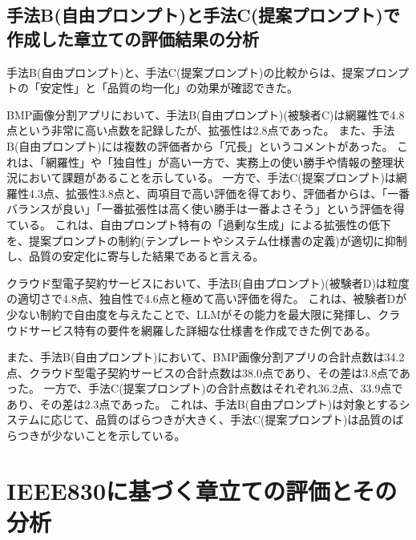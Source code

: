 
\subsection{手法B(自由プロンプト)と手法C(提案プロンプト)で作成した章立ての評価結果の分析}
手法B(自由プロンプト)と、手法C(提案プロンプト)の比較からは、提案プロンプトの「安定性」と「品質の均一化」の効果が確認できた。

BMP画像分割アプリにおいて、手法B(自由プロンプト)(被験者C)は網羅性で4.8点という非常に高い点数を記録したが、拡張性は2.8点であった。
また、手法B(自由プロンプト)には複数の評価者から「冗長」というコメントがあった。
これは、「網羅性」や「独自性」が高い一方で、実務上の使い勝手や情報の整理状況において課題があることを示している。
一方で、手法C(提案プロンプト)は網羅性4.3点、拡張性3.8点と、両項目で高い評価を得ており、評価者からは、「一番バランスが良い」「一番拡張性は高く使い勝手は一番よさそう」という評価を得ている。
これは、自由プロンプト特有の「過剰な生成」による拡張性の低下を、提案プロンプトの制約(テンプレートやシステム仕様書の定義)が適切に抑制し、品質の安定化に寄与した結果であると言える。

クラウド型電子契約サービスにおいて、手法B(自由プロンプト)(被験者D)は粒度の適切さで4.8点、独自性で4.6点と極めて高い評価を得た。
これは、被験者Dが少ない制約で自由度を与えたことで、LLMがその能力を最大限に発揮し、クラウドサービス特有の要件を網羅した詳細な仕様書を作成できた例である。

また、手法B(自由プロンプト)において、BMP画像分割アプリの合計点数は34.2点、クラウド型電子契約サービスの合計点数は38.0点であり、その差は3.8点であった。
一方で、手法C(提案プロンプト)の合計点数はそれぞれ36.2点、33.9点であり、その差は2.3点であった。
これは、手法B(自由プロンプト)は対象とするシステムに応じて、品質のばらつきが大きく、手法C(提案プロンプト)は品質のばらつきが少ないことを示している。


\section{IEEE830に基づく章立ての評価とその分析}


